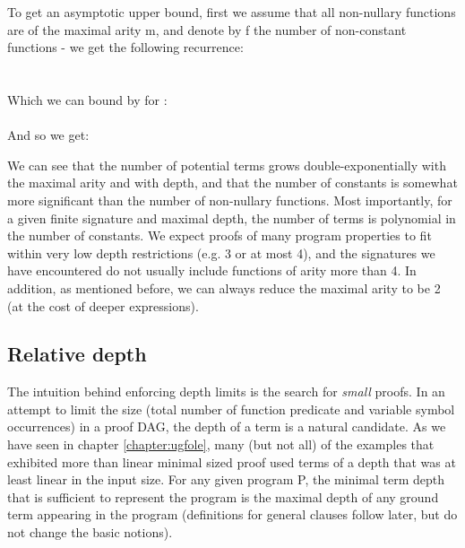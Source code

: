 To get an asymptotic upper bound, first we assume that all non-nullary functions are of the maximal arity m, and denote by f the number of non-constant functions - we get the following recurrence:\\
\\
\\
Which we can bound by  for :\\
\\
And so we get:\\

We can see that the number of potential terms grows double-exponentially with the maximal arity and with depth, 
and that the number of constants is somewhat more significant than the number of non-nullary functions.
Most importantly, for a given finite signature and maximal depth, the number of terms is polynomial in the number of constants.
We expect proofs of many program properties to fit within very low depth restrictions (e.g. 3 or at most 4), 
and the signatures we have encountered do not usually include functions of arity more than 4.
In addition, as mentioned before, we can always reduce the maximal arity to be 2 (at the cost of deeper expressions).


\subsection{Relative depth}
The intuition behind enforcing depth limits is the search for \emph{small} proofs.
In an attempt to limit the size (total number of function predicate and variable symbol occurrences) in a proof DAG,
the depth of a term is a natural candidate. As we have seen in chapter \ref{chapter:ugfole}, 
many (but not all) of the examples that exhibited more than linear minimal sized proof used terms of a depth that was at least linear in the input size.
For any given program P, the minimal term depth  that is sufficient to represent the program is the maximal depth of any ground term appearing in the program (definitions for general clauses follow later, but do not change the basic notions). 

